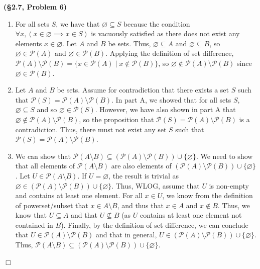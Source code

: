 \documentclass[12pt]{article}
\theoremstyle{definition}
\newenvironment{Solution}{\noindent {\sc Solution.}}{$\Box$ \vspace{2 ex}}
\begin{document}
\begin{Solution}
{\bf (\S2.7, Problem 6)}\\
\begin{enumerate}[label=\alph*.]
\item For all sets $S$, we have that $\varnothing \subseteq S$ because the condition $\forall x, (x\in \varnothing \implies x \in S)$ is vacuously satisfied as there does not exist any elements $x \in \varnothing$. Let $A$ and $B$ be sets. Thus, $\varnothing \subseteq A$ and $\varnothing \subseteq B$, so $\varnothing \in \mathcal P(A)$ and $\varnothing \in \mathcal P(B)$. Applying the definition of set difference, $\mathcal P(A) \setminus \mathcal P(B) = \{x\in \mathcal P(A) \mid x\not\in \mathcal P(B)\}$, so $\varnothing \not\in \mathcal P(A)\setminus\mathcal P(B)$ since $\varnothing \in \mathcal P(B)$.
\item Let $A$ and $B$ be sets. Assume for contradiction that there exists a set $S$ such that $\mathcal P(S) =\mathcal P(A) \setminus \mathcal P(B)$. In part A, we showed that for all sets $S$, $\varnothing \subseteq S$ and so $\varnothing \in \mathcal P(S)$. However, we have also shown in part A that $\varnothing \not \in \mathcal P(A) \setminus \mathcal P(B)$, so the proposition that $\mathcal P(S) = \mathcal P(A) \setminus \mathcal P(B)$ is a contradiction. Thus, there must not exist any set $S$ such that $\mathcal P(S) =\mathcal P(A) \setminus \mathcal P(B)$.
\item We can show that $\mathcal P(A \setminus B) \subseteq (\mathcal P(A)\setminus \mathcal P(B))\cup \{\varnothing\}$. We need to show that all elements of $\mathcal P(A\setminus B)$ are also elements of $(\mathcal P(A)\setminus \mathcal P(B))\cup \{\varnothing\}$. Let $U \in \mathcal P(A\setminus B)$. If $U =\varnothing$, the result is trivial as $\varnothing \in (\mathcal P(A)\setminus \mathcal P(B))\cup \{\varnothing\}$. Thus, WLOG, assume that $U$ is non-empty and contains at least one element. For all $x \in U$, we know from the definition of powerset/subset that $x \in A \setminus B$, and thus that $x \in A$ and $x \not \in B$. Thus, we know that $U \subseteq A$ and that $U \not \subseteq B$ (as $U$ contains at least one element not contained in $B$). Finally, by the definition of set difference, we can conclude that $U \in \mathcal P(A) \setminus \mathcal P(B)$ and that in general, $U \in (\mathcal P(A)\setminus \mathcal P(B))\cup \{\varnothing\}$. Thus, $\mathcal P(A \setminus B) \subseteq (\mathcal P(A)\setminus \mathcal P(B))\cup \{\varnothing\}$.
\end{enumerate}
\end{Solution} 
\end{document}

